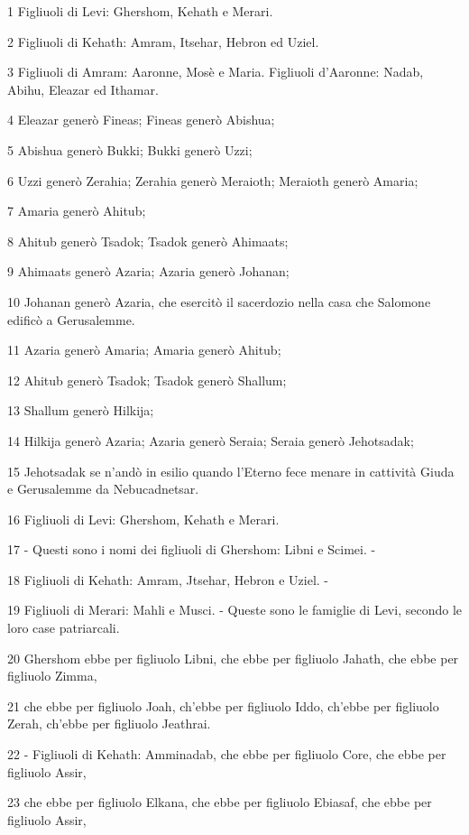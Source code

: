 \par 1 Figliuoli di Levi: Ghershom, Kehath e Merari.
\par 2 Figliuoli di Kehath: Amram, Itsehar, Hebron ed Uziel.
\par 3 Figliuoli di Amram: Aaronne, Mosè e Maria. Figliuoli d'Aaronne: Nadab, Abihu, Eleazar ed Ithamar.
\par 4 Eleazar generò Fineas; Fineas generò Abishua;
\par 5 Abishua generò Bukki; Bukki generò Uzzi;
\par 6 Uzzi generò Zerahia; Zerahia generò Meraioth; Meraioth generò Amaria;
\par 7 Amaria generò Ahitub;
\par 8 Ahitub generò Tsadok; Tsadok generò Ahimaats;
\par 9 Ahimaats generò Azaria; Azaria generò Johanan;
\par 10 Johanan generò Azaria, che esercitò il sacerdozio nella casa che Salomone edificò a Gerusalemme.
\par 11 Azaria generò Amaria; Amaria generò Ahitub;
\par 12 Ahitub generò Tsadok; Tsadok generò Shallum;
\par 13 Shallum generò Hilkija;
\par 14 Hilkija generò Azaria; Azaria generò Seraia; Seraia generò Jehotsadak;
\par 15 Jehotsadak se n'andò in esilio quando l'Eterno fece menare in cattività Giuda e Gerusalemme da Nebucadnetsar.
\par 16 Figliuoli di Levi: Ghershom, Kehath e Merari.
\par 17 - Questi sono i nomi dei figliuoli di Ghershom: Libni e Scimei. -
\par 18 Figliuoli di Kehath: Amram, Jtsehar, Hebron e Uziel. -
\par 19 Figliuoli di Merari: Mahli e Musci. - Queste sono le famiglie di Levi, secondo le loro case patriarcali.
\par 20 Ghershom ebbe per figliuolo Libni, che ebbe per figliuolo Jahath, che ebbe per figliuolo Zimma,
\par 21 che ebbe per figliuolo Joah, ch'ebbe per figliuolo Iddo, ch'ebbe per figliuolo Zerah, ch'ebbe per figliuolo Jeathrai.
\par 22 - Figliuoli di Kehath: Amminadab, che ebbe per figliuolo Core, che ebbe per figliuolo Assir,
\par 23 che ebbe per figliuolo Elkana, che ebbe per figliuolo Ebiasaf, che ebbe per figliuolo Assir,
